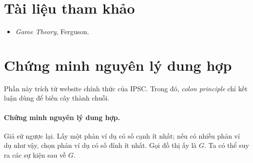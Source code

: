 \documentclass[11pt]{article}
\begin{document}
\section*{Tài liệu tham khảo}

\begin{itemize}
  \item \emph{Game Theory}, Ferguson.
\end{itemize}

\appendix

\section{Chứng minh nguyên lý dung hợp}

Phần này trích từ website chính thức của IPSC. Trong đó, \emph{colon
principle} chỉ kết luận dùng để biến cây thành chuỗi.

\paragraph{Chứng minh nguyên lý dung hợp.}
Giả sử ngược lại. Lấy một phản ví dụ có số cạnh ít nhất; nếu có nhiều phản ví
dụ như vậy, chọn phản ví dụ có số đỉnh ít nhất. Gọi đồ thị ấy là \(G\). Ta có
thể suy ra các sự kiện sau về \(G\).
\end{document}
